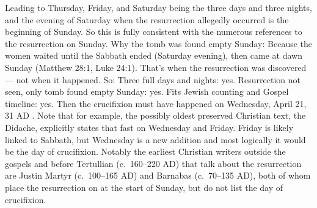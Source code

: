 Leading to Thursday, Friday, and Saturday being the three days and three nights, and the evening of Saturday when the resurrection allegedly occurred is the beginning of Sunday.
So this is fully consistent with the numerous references to the resurrection on Sunday.
Why the tomb was found empty Sunday: Because the women waited until the Sabbath ended (Saturday evening), then came at dawn Sunday (Matthew 28:1, Luke 24:1).
That’s when the resurrection was discovered — not when it happened.
So: Three full days and nights: yes.
Resurrection not seen, only tomb found empty Sunday: yes.
Fits Jewish counting and Gospel timeline: yes.
Then the crucifixion must have happened on Wednesday, April 21, 31 AD .
Note that for example, the possibly oldest preserved Christian text, the Didache, explicitly states that fast on Wednesday and Friday.
Friday is likely linked to Sabbath, but Wednesday is a new addition and most logically it would be the day of crucifixion.
Notably the earliest Christian writers outside the gospels and before Tertullian (c.~160–220 AD) that talk about the resurrection are Justin Martyr (c.~100–165 AD) and Barnabas (c.~70–135 AD), both of whom place the resurrection on at the start of Sunday, but do not list the day of crucifixion.
